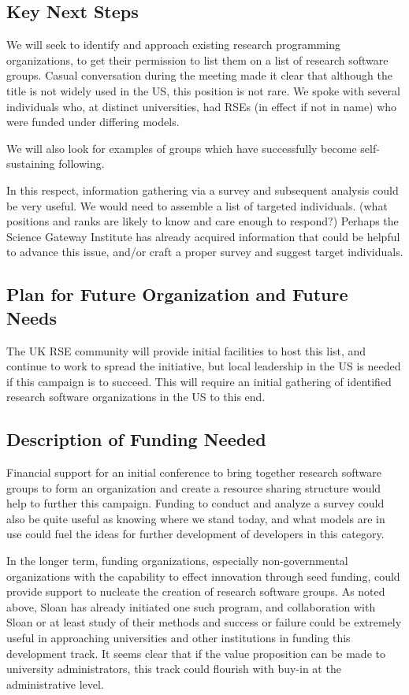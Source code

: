 \subsection{Key Next Steps}

We will seek to identify and approach existing research programming organizations,
to get their permission to list them on a list of research software groups.
Casual conversation during the meeting made it clear that although the title is
not widely used in the US, this position is not rare. We spoke with several
individuals who, at distinct universities, had RSEs (in effect if not in name)
who were funded under differing models.

We will also look for examples of groups which have successfully become self-
sustaining following. 

In this respect, information gathering via a survey and subsequent analysis could be
very useful. We would need to assemble a list of targeted individuals. (what
positions and ranks are likely to know and care enough to respond?) Perhaps the
Science Gateway Institute has already acquired information that could be helpful
to advance this issue, and/or craft a proper survey and suggest target individuals.

\subsection{Plan for Future Organization and Future Needs}

The UK RSE community will provide initial facilities to host this list, and
continue to work to spread the initiative, but local leadership in the US is
needed if this campaign is to succeed. This will require an initial gathering of
identified research software organizations in the US to this end.

\subsection{Description of Funding Needed}

Financial support for an initial conference to bring together research software
groups to form an organization and create a resource sharing structure would
help to further this campaign. Funding to conduct and analyze a survey could
also be quite useful as knowing where we stand today, and what models are in use
could fuel the ideas for further development of developers in this category.

In the longer term, funding organizations, especially non-governmental
organizations with the capability to effect innovation through seed funding,
could provide support to nucleate the creation of research software groups. As
noted above, Sloan has already initiated one such program, and collaboration
with Sloan or at least study of their methods and success or failure could be
extremely useful in approaching universities and other institutions in funding
this development track. It seems clear that if the value proposition can be made
to university administrators, this track could flourish with buy-in at the
administrative level.

